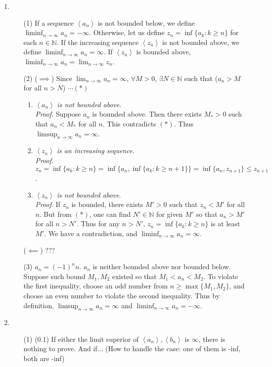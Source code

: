 \documentclass[12pt]{report}
\newcommand{\numl}[1]{\item[\large\textbf{\sffamily #1.}]}
\newcommand{\bb}[1]{\mathbb{#1}}
\renewcommand{\span}[1]{\left\langle #1 \right\rangle}
\newcommand{\ds}{\displaystyle}
\begin{document}
\begin{enumerate}
\numl{3}
\begin{enumerate}
	\item[(1)] If a sequence $\span{a_n}$ is not bounded below, we define $\ds \liminf_{n\rightarrow \infty} a_n = -\infty$. Otherwise, let us define $z_n = \inf\{a_k: k \geq n\}$ for each $n\in\bb{N}$. If the increasing sequence $\span{z_n}$ is not bounded above, we define $\ds \liminf_{n\rightarrow \infty} a_n = \infty$. If $\span{z_n}$ is bounded above, $\ds \liminf_{n\rightarrow \infty} a_n = \lim_{n\rightarrow \infty} z_n$.
	\item[(2)] ($\implies$) Since $\ds \lim_{n\rightarrow \infty}a_n \!=\! \infty$, $\forall M \!>\! 0$, $\exists N\in\bb{N}$ such that ($a_n > M$ for all $n > N$) $\cdots (*)$
	\begin{enumerate}
		\item $\span{a_n}$ \textit{is not bounded above}.\\
		\textit{Proof.} Suppose $a_n$ is bounded above. Then there exists $M_* > 0$ such that $a_n < M_*$ for all $n$. This contradicts $(*)$. Thus $\ds \limsup_{n\rightarrow \infty}a_n = \infty$.
		\item $\span{z_n}$ \textit{is an increasing sequence}.\\
		\textit{Proof.} $z_n \!= \inf\{a_k: k \geq n \}\! = \inf\{a_n, \inf\{a_k: k \geq n + 1 \} \}\! = \inf\{a_n, z_{n+1} \}\leq z_{n+1}$.
		\item $\span{z_n}$ \textit{is not bounded above}.\\
		\textit{Proof}. If $z_n$ is bounded, there exists $M' >0$ such that $z_n < M'$ for all $n$. But from $(*)$, one can find $N'\in \bb{N}$ for given $M'$ so that $a_n > M'$ for all $n > N'$. Thus for any $n>N'$, $z_n = \inf\{a_k: k \geq n \}$ is at least $M'$. We have a contradiction, and $\ds\liminf_{n\rightarrow \infty} a_n = \infty$.
	\end{enumerate}
	($\impliedby$) ???
	\item[(3)] $a_n = (-1)^nn$. $a_n$ is neither bounded above nor bounded below. Suppose such bound $M_1, M_2$ existed so that $M_1 < a_n < M_2$. To violate the first inequality, choose an odd number from $n \geq \max\{M_1, M_2 \}$, and choose an even number to violate the second inequality. Thus by definition, $\ds \limsup_{n\rightarrow \infty}a_n = \infty$ and $\ds \liminf_{n\rightarrow \infty}a_n = -\infty$.
\end{enumerate}

\numl{4} 
\begin{enumerate}
	\item[(1)] (0.1) If either the limit superior of $\span{a_n}, \span{b_n}$ is $\infty$, there is nothing to prove. And if... (How to handle the case: one of them is -inf, both are -inf)
	

\end{enumerate}
\end{enumerate}
\end{document}
